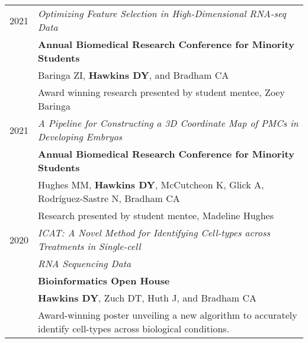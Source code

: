 \documentclass[a4paper,10pt]{report}
\begin{document}
\section{\color{linkcolour}{Posters and Presentations}}
\begin{longtable}{rp{11cm}}
	\textsc{2021} & \emph{Optimizing Feature Selection in High-Dimensional RNA-seq Data}                                                   \\
	              & \textbf{Annual Biomedical Research Conference for Minority Students}                                                   \\
	              & \footnotesize Baringa ZI, \textbf{Hawkins DY}, and Bradham CA                                                          \\
	              & \small{Award winning research presented by student mentee, Zoey Baringa}                                               \\
	\textsc{2021} & \emph{A Pipeline for Constructing a 3D Coordinate Map of PMCs in Developing Embryos}                                   \\
	              & \textbf{Annual Biomedical Research Conference for Minority Students}                                                   \\
	              & \footnotesize Hughes MM, \textbf{Hawkins DY}, McCutcheon K, Glick A, Rodríguez-Sastre N, Bradham CA                    \\
	              & \small{Research presented by student mentee, Madeline Hughes}                                                          \\
	\textsc{2020} & \emph{ICAT: A Novel Method for Identifying Cell-types across
	Treatments in Single-cell}                                                                                                             \\
	              & \emph{RNA Sequencing Data}                                                                                             \\
	              & \textbf{Bioinformatics Open House}                                                                                     \\
	              & \footnotesize \textbf{Hawkins DY}, Zuch DT, Huth J, and Bradham CA                                                     \\
	              & \small{Award-winning poster unveiling a new algorithm to accurately identify cell-types across biological conditions.} \\

\end{longtable}
\end{document}
